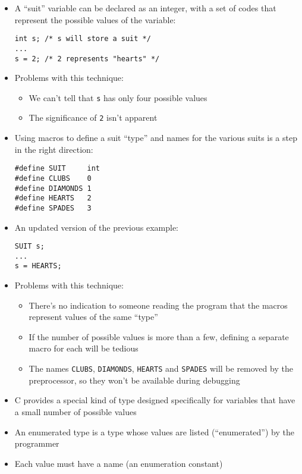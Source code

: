 \documentclass{article}
\begin{document}
\begin{itemize}
\item A ``suit'' variable can be declared as an integer, with a set of codes that represent the possible values of the variable:
\begin{verbatim}
int s; /* s will store a suit */
...
s = 2; /* 2 represents "hearts" */
\end{verbatim}

\item Problems with this technique:
\begin{itemize}
\item We can't tell that \verb!s! has only four possible values
\item The significance of \verb!2! isn't apparent
\end{itemize}
\end{itemize}
\begin{itemize}
\item Using macros to define a suit ``type'' and names for the various suits is a step in the right direction:
\begin{verbatim}
#define SUIT     int
#define CLUBS    0
#define DIAMONDS 1
#define HEARTS   2
#define SPADES   3
\end{verbatim}

\item An updated version of the previous example:
\begin{verbatim}
SUIT s;
...
s = HEARTS;
\end{verbatim}
\end{itemize}
\begin{itemize}
\item Problems with this technique:
\begin{itemize}
\item There's no indication to someone reading the program that the macros represent values of the same ``type''

\item If the number of possible values is more than a few, defining a separate macro for each will be tedious

\item The names \verb!CLUBS!, \verb!DIAMONDS!, \verb!HEARTS! and \verb!SPADES! will be removed by the preprocessor, so they won't be available during debugging
\end{itemize}
\end{itemize}
\begin{itemize}
\item C provides a special kind of type designed specifically for variables that have a small number of possible values

\item An enumerated type is a type whose values are listed (``enumerated'') by the programmer

\item Each value must have a name (an enumeration constant)
\end{itemize}
\end{document}
